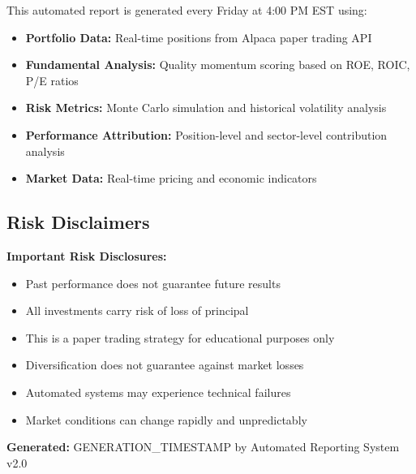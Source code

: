 \documentclass[11pt]{article}
\begin{document}
This automated report is generated every Friday at 4:00 PM EST using:
\begin{itemize}
    \item \textbf{Portfolio Data:} Real-time positions from Alpaca paper trading API
    \item \textbf{Fundamental Analysis:} Quality momentum scoring based on ROE, ROIC, P/E ratios
    \item \textbf{Risk Metrics:} Monte Carlo simulation and historical volatility analysis
    \item \textbf{Performance Attribution:} Position-level and sector-level contribution analysis
    \item \textbf{Market Data:} Real-time pricing and economic indicators
\end{itemize}

\subsection{Risk Disclaimers}

\begin{small}
\textbf{Important Risk Disclosures:}
\begin{itemize}
    \item Past performance does not guarantee future results
    \item All investments carry risk of loss of principal
    \item This is a paper trading strategy for educational purposes only
    \item Diversification does not guarantee against market losses
    \item Automated systems may experience technical failures
    \item Market conditions can change rapidly and unpredictably
\end{itemize}

\textbf{Generated:} {{GENERATION_TIMESTAMP}} by Automated Reporting System v2.0
\end{small}
\end{document}
